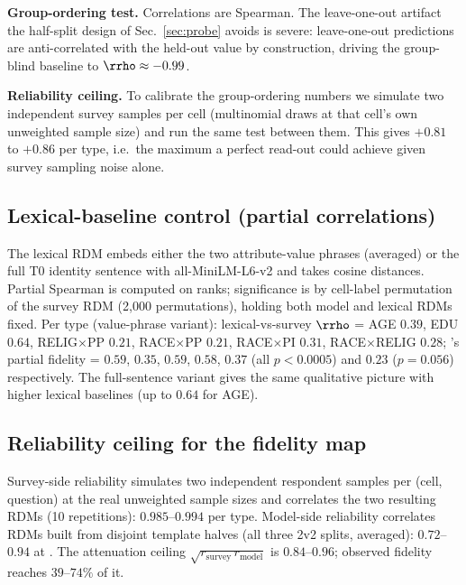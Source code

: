 \textbf{Group-ordering test.} Correlations are Spearman. The
leave-one-out artifact the half-split design of Sec.~\ref{sec:probe}
avoids is severe: leave-one-out predictions are anti-correlated with the
held-out value by construction, driving the group-blind baseline to
$\rrho\approx-0.99$.

\textbf{Reliability ceiling.} To calibrate the group-ordering numbers we
simulate two independent survey samples per cell (multinomial draws at
that cell's own unweighted sample size) and run the same test between
them. This gives $+0.81$ to $+0.86$ per type, i.e.\ the maximum a perfect
read-out could achieve given survey sampling noise alone.

\subsection{Lexical-baseline control (partial correlations)}
\label{app:lexical}
The lexical RDM embeds either the two attribute-value phrases (averaged)
or the full T0 identity sentence with all-MiniLM-L6-v2 \citep{minilm2020}
and takes cosine distances. Partial Spearman is computed on ranks;
significance is by cell-label permutation of the survey RDM (2{,}000
permutations), holding both model and lexical RDMs fixed. Per type
(value-phrase variant): lexical-vs-survey $\rrho$ = AGE $0.39$, EDU
$0.64$, RELIG$\times$PP $0.21$, RACE$\times$PP $0.21$, RACE$\times$PI
$0.31$, RACE$\times$RELIG $0.28$; \starhead's partial fidelity = $0.59$,
$0.35$, $0.59$, $0.58$, $0.37$ (all $p<0.0005$) and $0.23$ ($p=0.056$)
respectively. The full-sentence variant gives the same qualitative
picture with higher lexical baselines (up to $0.64$ for AGE).

\subsection{Reliability ceiling for the fidelity map}
\label{app:reliability}
Survey-side reliability simulates two independent respondent samples per
(cell, question) at the real unweighted sample sizes and correlates the
two resulting RDMs (10 repetitions): $0.985$--$0.994$ per type.
Model-side reliability correlates RDMs built from disjoint template
halves (all three 2v2 splits, averaged): $0.72$--$0.94$ at \starhead.
The attenuation ceiling $\sqrt{r_{\text{survey}}\, r_{\text{model}}}$ is
$0.84$--$0.96$; observed fidelity reaches $39$--$74\%$ of it.

